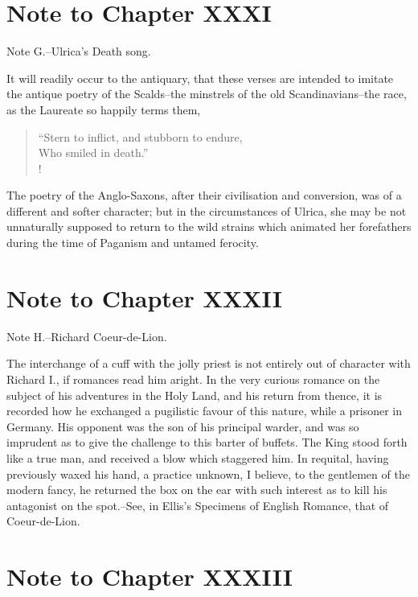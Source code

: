 \section*{Note to Chapter XXXI}\label{noteCXXXI}

Note G.--Ulrica's Death song.

It will readily occur to the antiquary, that these verses are intended
to imitate the antique poetry of the Scalds--the minstrels of the old
Scandinavians--the race, as the Laureate so happily terms them,

\begin{verse}
``Stern to inflict, and stubborn to endure,\\
Who smiled in death.''\\!
\end{verse}

The poetry of the Anglo-Saxons, after their civilisation and conversion,
was of a different and softer character; but in the circumstances of
Ulrica, she may be not unnaturally supposed to return to the wild
strains which animated her forefathers during the time of Paganism and
untamed ferocity.

\section*{Note to Chapter XXXII}\label{noteCXXXII}

Note H.--Richard Coeur-de-Lion.

The interchange of a cuff with the jolly priest is not entirely out of
character with Richard I., if romances read him aright. In the very
curious romance on the subject of his adventures in the Holy Land, and
his return from thence, it is recorded how he exchanged a pugilistic
favour of this nature, while a prisoner in Germany. His opponent was the
son of his principal warder, and was so imprudent as to give the
challenge to this barter of buffets. The King stood forth like a true
man, and received a blow which staggered him. In requital, having
previously waxed his hand, a practice unknown, I believe, to the
gentlemen of the modern fancy, he returned the box on the ear with such
interest as to kill his antagonist on the spot.--See, in Ellis's
Specimens of English Romance, that of Coeur-de-Lion.

\section*{Note to Chapter XXXIII}\label{noteCXXXIII}

